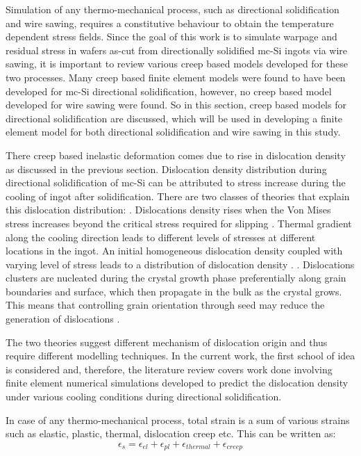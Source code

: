 Simulation of any thermo-mechanical process, such as directional solidification and wire sawing, requires a constitutive behaviour to obtain the temperature dependent stress fields. Since the goal of this work is to simulate warpage and residual stress in wafers as-cut from directionally solidified mc-Si ingots via wire sawing, it is important to review various creep based models developed for these two processes. Many creep based finite element models were found to have been developed for mc-Si directional solidification, however, no creep based model developed for wire sawing were found. So in this section, creep based models for directional solidification are discussed, which will be used in developing a finite element model for both directional solidification and wire sawing in this study.  

There creep based inelastic deformation comes due to rise in dislocation density as discussed in the previous section. Dislocation density distribution during directional solidification of mc-Si can be attributed to stress increase during the cooling of ingot after solidification. There are two classes of theories that explain this dislocation distribution:
. Dislocations density rises when the Von Mises stress increases beyond the critical stress required for slipping \cite{alexander1969dislocations}. Thermal gradient along the cooling direction leads to different levels of stresses at different locations in the ingot. An initial homogeneous dislocation density coupled with varying level of stress leads to a distribution of dislocation density \cite{meese2006thermo,nakano2011numerical}. 
. Dislocations clusters are nucleated during the crystal growth phase preferentially along grain boundaries and surface, which then propagate in the bulk as the crystal grows. This means that controlling grain orientation through seed may reduce the generation of dislocations \cite{takahashi2010generation}. 

The two theories suggest different mechanism of dislocation origin and thus require different modelling techniques. In the current work, the first school of idea is considered and, therefore, the literature review covers work done involving finite element numerical simulations developed to predict the dislocation density under various cooling conditions during directional solidification.

In case of any thermo-mechanical process, total strain is a sum of various strains such as elastic, plastic, thermal, dislocation creep etc. This can be written as:
\begin{equation}
\epsilon_{s} = \epsilon_{el} + \epsilon_{pl} + \epsilon_{thermal} + \epsilon_{creep}
\label {strainEq}
\end{equation}

